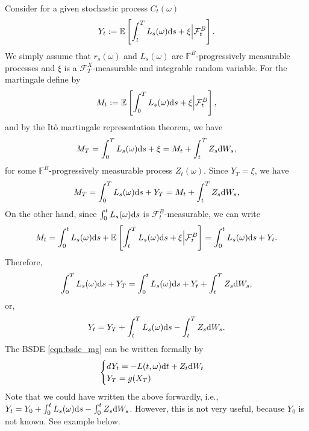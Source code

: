 \documentclass[11pt]{book}
\newcommand{\dt}{\text{\normalfont d}t}
\newcommand{\ds}{\text{\normalfont d}s}
\newcommand{\dW}{\text{\normalfont d}W}
\begin{document}
Consider for a given stochastic process $C_t(\omega)$ 
\begin{equation}
Y_t:=\mathbb{E}\left[\int_t^T   L_s(\omega){{\ds}} + \xi \Big|\mathcal{F}^B_t\right].
\end{equation}
We simply assume that $r_s(\omega)$ and $L_s(\omega)$ are $\mathbb{F}^B$-progressively measurable processes and $\xi$ is a $\mathcal{F}_T^X$-measurable and integrable random variable. For the martingale define by 
\begin{equation}
M_t:=\mathbb{E}\left[\int_0^T  L_s(\omega){{\ds}}+\xi\Big|\mathcal{F}^B_t\right],
\end{equation}
and by the It\^o martingale representation theorem, we have
\begin{equation}
M_T=\int_0^T   L_s(\omega){{\ds}}+\xi=M_t+\int_t^TZ_s\dW_s,
\end{equation}
for some $\mathbb{F}^B$-progressively measurable process $Z_t(\omega)$.
Since $Y_T=\xi$, we have 
\begin{equation}
M_T=\int_0^T   L_s(\omega){{\ds}}+Y_T=M_t+\int_t^TZ_s\dW_s,
\end{equation}
On the other hand,
since $\int_0^t   L_s(\omega){{\ds}}$ is $\mathcal{F}^B_t$-measurable, we can write
\begin{equation}
M_t=\int_0^t   L_s(\omega){{\ds}}+\mathbb{E}\left[\int_t^T   L_s(\omega){{\ds}}+\xi\Big|\mathcal{F}^B_t\right]=\int_0^t   L_s(\omega){{\ds}}+Y_t.
\end{equation}
Therefore,
\begin{equation}
\int_0^T   L_s(\omega){{\ds}}+Y_T=\int_0^t   L_s(\omega){{\ds}}+Y_t+\int_t^TZ_s\dW_s,
\end{equation}
or,
\begin{equation}\label{eqn:bsde_mg}
Y_t=Y_T+\int_t^T   L_s(\omega){{\ds}}-\int_t^TZ_s\dW_s.
\end{equation}
The BSDE \eqref{eqn:bsde_mg} can be written formally by 
\begin{equation}
\begin{cases}
dY_t=- L(t,\omega){{\dt}}+Z_t\dW_t\\
Y_T=g(X_T)
\end{cases}
\end{equation}
Note that we could have written the above forwardly, i.e.,
$Y_t=Y_0+\int_0^t   L_s(\omega){{\ds}}-\int_0^tZ_s\dW_s$. However, this is not very useful, because $Y_0$ is not known. See example below.
\end{document}
